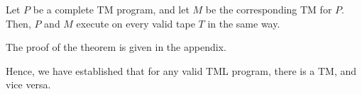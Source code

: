 \begin{theorem}
    Let $P$ be a complete TM program, and let $M$ be the corresponding TM for $P$. Then, $P$ and $M$ execute on every valid tape $T$ in the same way.
\end{theorem}
The proof of the theorem is given in the appendix.

Hence, we have established that for any valid TML program, there is a TM, and vice versa.
